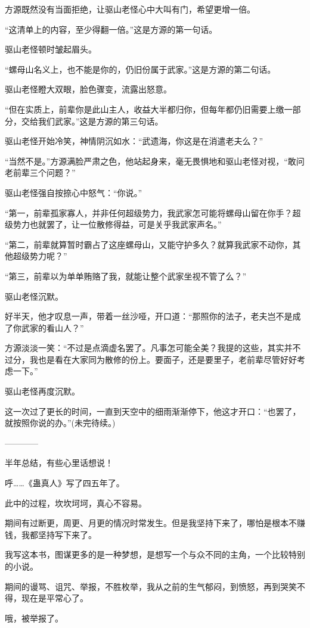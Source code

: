 \begin{this_body}
方源既然没有当面拒绝，让驱山老怪心中大叫有门，希望更增一倍。

“这清单上的内容，至少得翻一倍。”这是方源的第一句话。

驱山老怪顿时皱起眉头。

“螺母山名义上，也不能是你的，仍旧份属于武家。”这是方源的第二句话。

驱山老怪瞪大双眼，脸色骤变，流露出怒意。

“但在实质上，前辈你是此山主人，收益大半都归你，但每年都仍旧需要上缴一部分，交给我们武家。”这是方源的第三句话。

驱山老怪开始冷笑，神情阴沉如水：“武遗海，你这是在消遣老夫么？”

“当然不是。”方源满脸严肃之色，他站起身来，毫无畏惧地和驱山老怪对视，“敢问老前辈三个问题？”

驱山老怪强自按捺心中怒气：“你说。”

“第一，前辈孤家寡人，并非任何超级势力，我武家怎可能将螺母山留在你手？超级势力也就罢了，让一位散修得益，可是关乎我武家声名。”

“第二，前辈就算暂时霸占了这座螺母山，又能守护多久？就算我武家不动你，其他超级势力呢？”

“第三，前辈以为单单贿赂了我，就能让整个武家坐视不管了么？”

驱山老怪沉默。

好半天，他才叹息一声，带着一丝沙哑，开口道：“那照你的法子，老夫岂不是成了你武家的看山人？”

方源淡淡一笑：“不过是点滴虚名罢了。凡事怎可能全美？我提的这些，其实并不过分，我也是看在大家同为散修的份上。要面子，还是要里子，老前辈尽管好好考虑一下。”

驱山老怪再度沉默。

这一次过了更长的时间，一直到天空中的细雨渐渐停下，他这才开口：“也罢了，就按照你说的办。”(未完待续。)

------------

半年总结，有些心里话想说！

呼……《蛊真人》写了四五年了。

此中的过程，坎坎坷坷，真心不容易。

期间有过断更，周更、月更的情况时常发生。但是我坚持下来了，哪怕是根本不赚钱，我都坚持写下来了。

我写这本书，图谋更多的是一种梦想，是想写一个与众不同的主角，一个比较特别的小说。

期间的谩骂、诅咒、举报，不胜枚举，我从之前的生气郁闷，到愤怒，再到哭笑不得，现在是平常心了。

哦，被举报了。


\end{this_body}
